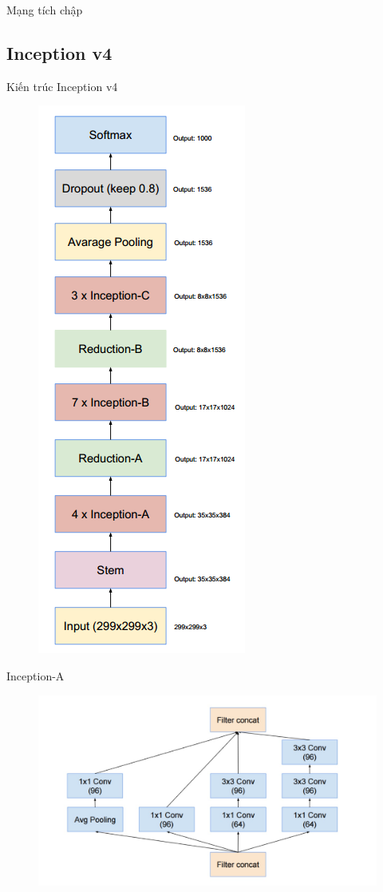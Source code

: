 \documentclass[compress]{beamer}
\begin{document}
\begin{frame}{Mạng tích chập}
\subsection{Inception v4}
\begin{frame}{Kiến trúc Inception v4}
\begin{figure}[H]
\includegraphics[scale=0.3]{inceptionv4.png}
\end{figure}
\end{frame}

\begin{frame}{Inception-A}
\begin{figure}[H]
\includegraphics[scale=0.29]{inceptionA.jpg}
\end{figure}
\end{frame}


\end{frame}
\end{document}
